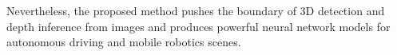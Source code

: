 \documentclass[letterpaper, 10 pt, journal, twoside]{IEEEtran}
\begin{document}
Nevertheless, the proposed method pushes the boundary of 3D detection and depth inference from images and produces powerful neural network models for autonomous driving and mobile robotics scenes.
 


\ifCLASSOPTIONcaptionsoff
  \newpage
\fi






  

  
\end{document}
